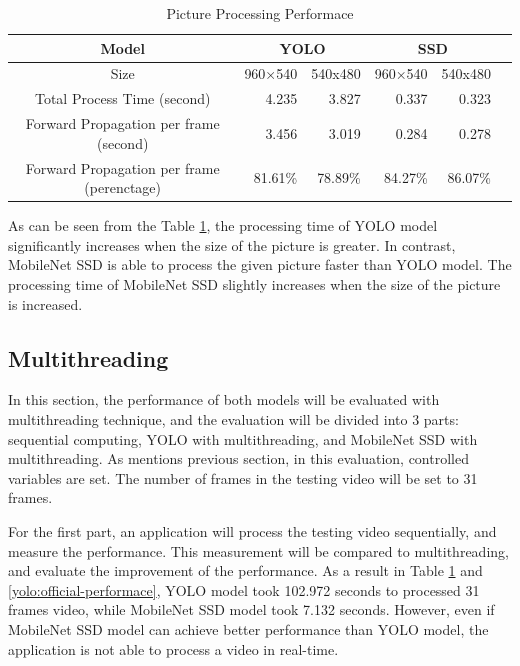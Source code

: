             \begin{table}[!htp]\centering
                \scriptsize
                \begin{tabular}{lrrrrrr}\toprule
                    \multicolumn{2}{c}{Model} &\multicolumn{2}{c}{YOLO} &\multicolumn{2}{c}{SSD} \\\midrule
                    \multicolumn{2}{c}{Size} &960×540 &540x480 &960×540 &540x480 \\
                    \multicolumn{2}{c}{Total Process Time (second)} &4.235 &3.827 &0.337 &0.323 \\
                    \multicolumn{2}{c}{Forward Propagation per frame (second)} &3.456 &3.019 &0.284 &0.278 \\
                    \multicolumn{2}{c}{Forward Propagation per frame (perenctage)} &81.61\% &78.89\% &84.27\% &86.07\% \\
                    \bottomrule
                \end{tabular}

                \caption{Picture Processing Performace}\label{performance:picture}
            \end{table}

            As can be seen from the Table \ref{performance:picture}, the processing time of YOLO model significantly increases when the size of the picture is greater.
            In contrast, MobileNet SSD is able to process the given picture faster than YOLO model.
            The processing time of MobileNet SSD slightly increases when the size of the picture is increased.

        \subsection{Multithreading}

            In this section, the performance of both models will be evaluated with multithreading technique,
            and the evaluation will be divided into 3 parts: sequential computing, YOLO with multithreading, and MobileNet SSD with multithreading.
            As mentions previous section, in this evaluation, controlled variables are set.
            The number of frames in the testing video will be set to 31 frames.

            For the first part, an application will process the testing video sequentially, and measure the performance.
            This measurement will be compared to multithreading, and evaluate the improvement of the performance.
            As a result in Table \ref{performance:picture} and \ref{yolo:official-performace},
            YOLO model took 102.972 seconds to processed 31 frames video, while MobileNet SSD model took 7.132 seconds.
            However, even if MobileNet SSD model can achieve better performance than YOLO model,
            the application is not able to process a video in real-time.

